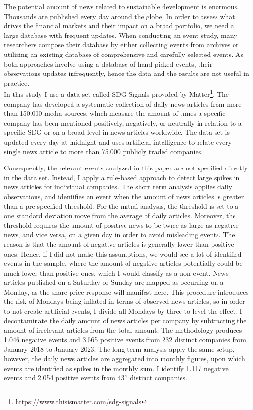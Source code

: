 The potential amount of news related to sustainable development is enormous. Thousands are published every day around the globe. In order to assess what drives the financial markets and their impact on a broad portfolio, we need a large database with frequent updates. When conducting an event study, many researchers compose their database by either collecting events from archives or utilizing an existing database of comprehensive and carefully selected events. As both approaches involve using a database of hand-picked events, their observations updates infrequently, hence the data and the results are not useful in practice. \\
In this study I use a data set called SDG Signals provided by Matter\footnote{https://www.thisismatter.com/sdg-signals}. The company has developed a systematic collection of daily news articles from more than 150.000 media sources, which measure the amount of times a specific company has been mentioned positively, negatively, or neutrally in relation to a specific SDG or on a broad level in news articles worldwide.   
The data set is updated every day at midnight and uses artificial intelligence to relate every single news article to more than 75.000 publicly traded companies. 

Consequently, the relevant events analyzed in this paper are not specified directly in the data set. Instead, I apply a rule-based approach to detect large spikes in news articles for individual companies. The short term analysis applies daily observations, and identifies an event when the amount of news articles is greater than a pre-specified threshold. For the initial analysis, the threshold is set to a one standard deviation move from the average of daily articles. Moreover, the threshold requires the amount of positive news to be twice as large as negative news, and vice versa, on a given day in order to avoid misleading events. The reason is that the amount of negative articles is generally lower than positive ones. Hence, if I did not make this assumptions, we would see a lot of identified events in the sample, where the amount of negative articles potentially could be much lower than positive ones, which I would classify as a non-event. News articles published on a Saturday or Sunday are mapped as occurring on a Monday, as the share price response will manifest here. This procedure introduces the risk of Mondays being inflated in terms of observed news articles, so in order to not create artificial events, I divide all Mondays by three to level the effect. I decontaminate the daily amount of news articles per company by subtracting the amount of irrelevant articles from the total amount. The methodology produces 1.046 negative events and 3.565 positive events from 232 distinct companies from January 2018 to January 2023. The long term analysis apply the same setup, however, the daily news articles are aggregated into monthly figures, upon which events are identified as spikes in the monthly sum. I identify 1.117 negative events and 2.054 positive events from 437 distinct companies. 

